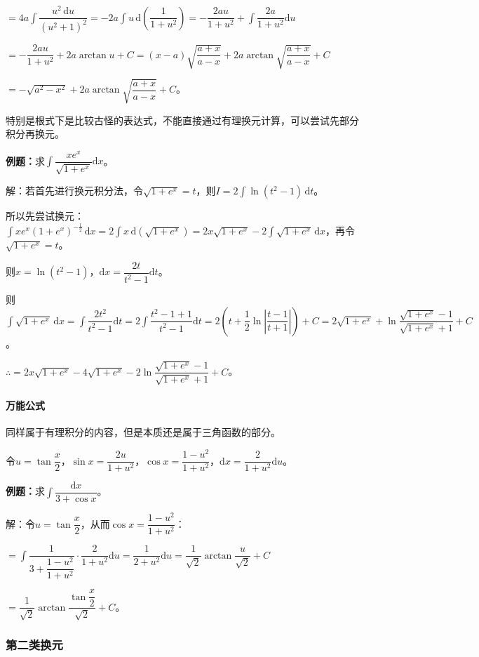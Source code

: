 \documentclass[UTF8, 12pt]{ctexart}
\begin{document}
$=\displaystyle{4a\int\dfrac{u^2\,\textrm{d}u}{(u^2+1)^2}=-2a\int u\,\textrm{d}\left(\dfrac{1}{1+u^2}\right)=-\dfrac{2au}{1+u^2}+\int\dfrac{2a}{1+u^2}\textrm{d}u}$

$=-\dfrac{2au}{1+u^2}+2a\arctan u+C=(x-a)\sqrt{\dfrac{a+x}{a-x}}+2a\arctan\sqrt{\dfrac{a+x}{a-x}}+C$

$=-\sqrt{a^2-x^2}+2a\arctan\sqrt{\dfrac{a+x}{a-x}}+C$。

特别是根式下是比较古怪的表达式，不能直接通过有理换元计算，可以尝试先部分积分再换元。

\textbf{例题：}求$\displaystyle{\int\dfrac{xe^x}{\sqrt{1+e^x}}\textrm{d}x}$。

解：若首先进行换元积分法，令$\sqrt{1+e^x}=t$，则$I=2\int\ln(t^2-1)\,\textrm{d}t$。

所以先尝试换元：$\int xe^x(1+e^x)^{-\frac{1}{2}}\,\textrm{d}x=2\int x\,\textrm{d}(\sqrt{1+e^x})=2x\sqrt{1+e^x}-2\int\sqrt{1+e^x}\,\textrm{d}x$，再令$\sqrt{1+e^x}=t$。

则$x=\ln(t^2-1)$，$\textrm{d}x=\dfrac{2t}{t^2-1}\textrm{d}t$。

则$\displaystyle{\int\sqrt{1+e^x}\,\textrm{d}x=\int\dfrac{2t^2}{t^2-1}\textrm{d}t=2\int\dfrac{t^2-1+1}{t^2-1}\textrm{d}t}=2\left(t+\dfrac{1}{2}\ln\left\vert\dfrac{t-1}{t+1}\right\vert\right)+C=2\sqrt{1+e^x}+\ln\dfrac{\sqrt{1+e^x}-1}{\sqrt{1+e^x}+1}+C$。

$\therefore=2x\sqrt{1+e^x}-4\sqrt{1+e^x}-2\ln\dfrac{\sqrt{1+e^x}-1}{\sqrt{1+e^x}+1}+C$。

\paragraph{万能公式} \leavevmode \medskip

同样属于有理积分的内容，但是本质还是属于三角函数的部分。

令$u=\tan\dfrac{x}{2}$，$\sin x=\dfrac{2u}{1+u^2}$，$\cos x=\dfrac{1-u^2}{1+u^2}$，$\textrm{d}x=\dfrac{2}{1+u^2}\textrm{d}u$。

\textbf{例题：}求$\displaystyle{\int\dfrac{\textrm{d}x}{3+\cos x}}$。

解：令$u=\tan\dfrac{x}{2}$，从而$\cos x=\dfrac{1-u^2}{1+u^2}$：

$=\displaystyle{\int\dfrac{1}{3+\dfrac{1-u^2}{1+u^2}}\cdot\dfrac{2}{1+u^2}\textrm{d}u=\dfrac{1}{2+u^2}\textrm{d}u=\dfrac{1}{\sqrt{2}}\arctan\dfrac{u}{\sqrt{2}}+C}$

$=\dfrac{1}{\sqrt{2}}\arctan\dfrac{\tan\dfrac{x}{2}}{\sqrt{2}}+C$。

\subsubsection{第二类换元}
\end{document}
